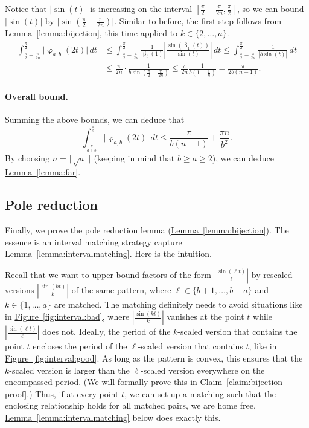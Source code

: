\documentclass[11pt]{article}
\numberwithin{equation}{section}
\theoremstyle{definition}
\theoremstyle{plain}
\newcommand{\expref}[2]{\hyperref[#2]{#1~\ref{#2}}}
\DeclareMathOperator{\charfn}{\varphi}
\DeclareMathOperator{\bij}{\beta}
\begin{document}
Notice that $\lvert\sin(t)\rvert$ is increasing on the interval $[\frac{\pi}{2}-\frac{\pi}{2n},\frac{\pi}{2}]$, so we can bound $\lvert\sin(t)\rvert$ by $\lvert\sin(\frac{\pi}{2}-\frac{\pi}{2n})\rvert$. Similar to before, the first step follows from \expref{Lemma}{lemma:bijection}, this time applied to $k \in \{2,\dots,a\}$. 
\begin{align*}
    \int_{\frac{\pi}{2}-\frac{\pi}{2n}}^{\frac{\pi}{2}} \lvert\charfn_{a,b}(2t)\rvert\,dt 
    &\le \int_{\frac{\pi}{2}-\frac{\pi}{2n}}^{\frac{\pi}{2}} \frac{1}{\bij_t(1)} \left\lvert\frac{\sin(\bij_1(t))}{\sin(t)}\right\rvert\,dt
    \le \int_{\frac{\pi}{2}-\frac{\pi}{2n}}^{\frac{\pi}{2}} \frac{1}{|b \sin(t)|}\,dt\\
    &\le \frac{\pi}{2n}\cdot \frac{1}{b\sin(\frac{\pi}{2}-\frac{\pi}{2n})}
    \le \frac{\pi}{2n}\frac{1}{b(1-\frac{1}{n})}
    = \frac{\pi}{2b(n-1)}.
\end{align*}

\paragraph{Overall bound.}

Summing the above bounds, we can deduce that
\[\int_{\frac{\pi}{a+b}}^{\frac{\pi}{2}} \lvert\charfn_{a,b}(2t)\rvert\,dt \le \frac{\pi}{b(n-1)}+\frac{\pi n}{b^2}.  \]
By choosing $n=\lceil\sqrt{a} \,\rceil$ (keeping in mind that $b\ge a \ge 2$), we can deduce \expref{Lemma}{lemma:far}.

\subsection{Pole reduction}
\label{sec:pole-reduction}

Finally, we prove the pole reduction lemma (\expref{Lemma}{lemma:bijection}). The essence is an interval matching strategy capture \expref{Lemma}{lemma:intervalmatching}. Here is the intuition. 

Recall that we want to upper bound factors of the form $|\frac{\sin(\ell t)}{\ell}|$ by rescaled versions $|\frac{\sin(k t)}{k}|$ of the same pattern, where $\ell \in \{b+1,\dots,b+a\}$ and $k \in \{1,\dots,a\}$ are matched. The matching definitely needs to avoid situations like in \expref{Figure}{fig:interval:bad}, where $|\frac{\sin(kt)}{k}|$ vanishes at the point $t$ while $|\frac{\sin(\ell t)}{\ell}|$ does not. Ideally, the period of the $k$-scaled version that contains the point $t$ encloses the period of the $\ell$-scaled version that contains $t$, like in \expref{Figure}{fig:interval:good}. As long as the pattern is convex, this ensures that the $k$-scaled version is larger than the $\ell$-scaled version everywhere on the encompassed period. (We will formally prove this in \expref{Claim}{claim:bijection-proof}.) Thus, if at every point $t$, we can set up a matching such that the enclosing relationship holds for all matched pairs, we are home free. \expref{Lemma}{lemma:intervalmatching} below does exactly this.
\end{document}
